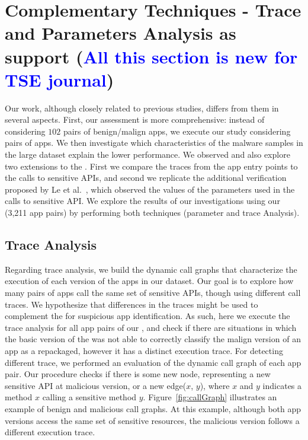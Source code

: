 \section{Complementary Techniques - Trace and Parameters Analysis as \mas support (\textcolor{blue}{All this section is new for TSE journal})}\label{sec:complementary}


Our work, although closely related to previous studies, differs from them in several aspects.  First, our assessment is more comprehensive: instead of considering $102$ pairs of benign/malign apps, we execute our study considering \apps pairs of apps. We then investigate which characteristics of the malware samples in the large dataset explain the lower performance. We observed and also explore two extensions to the \mas. First we compare the traces from the app entry points to the calls to sensitive APIs, and second we replicate the additional verification proposed by Le et al.~\cite{le2018towards}, which observed the values of the parameters used in the calls to sensitive API. We explore the results of our investigations using our \cds (3,211 app pairs) by performing both techniques (parameter and trace Analysis).


\subsection{Trace Analysis}

Regarding trace analysis, we build the dynamic call graphs that characterize the execution of each version of the apps in our dataset. Our goal is to explore how many pairs of apps call the same set of sensitive APIs, though using different call traces. We hypothesize that differences in the traces might be used to complement the \mas for suspicious app identification. As such, here we execute the trace analysis for all app pairs of our \cds, and check if there are situations in which the basic version of the \mas was not able to correctly classify the malign version of an app as a repackaged, however it has a distinct execution trace. For detecting different trace, we performed an evaluation of the dynamic call graph of each app pair. Our procedure checks if there is some new node, representing a new sensitive API at malicious version, or a new edge($x$, $y$), where $x$ and $y$ indicates a method $x$ calling a sensitive method $y$. Figure~\ref{fig:callGraph} illustrates an example of benign and malicious call graphs.
At this example, although both app versions access the same set of sensitive resources, the
malicious version follows a different execution trace.




